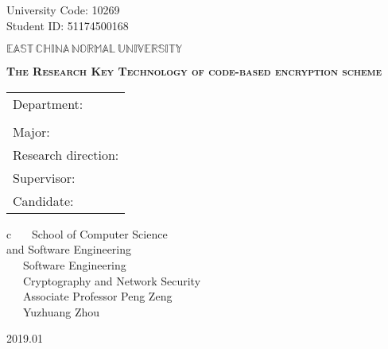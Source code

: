 \newpage

\pagestyle{empty}

\hskip 1.83cm {\large University Code: 10269}\\
\hspace*{\fill} {\large Student ID: 51174500168}

\vskip 2cm

\begin{center}
{\Huge $\mathbb{EAST}\,\mathbb{CHINA}\,\mathbb{NORMAL}\,
\mathbb{UNIVERSITY}$}
\end{center}

\vskip 3cm

\begin{center}
\bfseries{\scshape{\huge The Research Key Technology of code-based encryption scheme}}\\
\end{center}

\vskip 2cm {\large
\begin{center}
\begin{tabular}{l}
Department:\\ \\
Major:\\
Research direction:\\
Supervisor:\\
Candidate:
\end{tabular}
\begin{tabular}c
~~~School of Computer Science \\ and Software Engineering       \\
\hline ~~~Software Engineering    \\
\hline ~~~Cryptography and Network Security\\
\hline ~~~Associate Professor Peng Zeng\\
\hline ~~~Yuzhuang Zhou\\
\hline
\end{tabular}
\end{center}}

\vskip 30mm

\begin{center}
{\Large 2019.01}
\end{center}